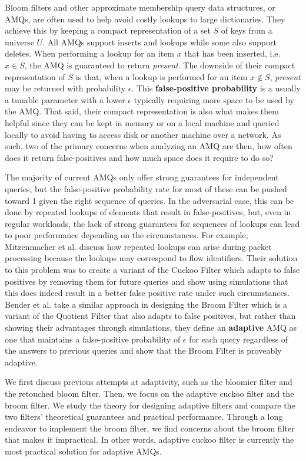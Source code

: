 \documentclass[../paper.tex]{subfiles}
\begin{document}
    Bloom filters and other approximate membership query data structures, or
    AMQs, are often used to help avoid costly lookups to large dictionaries.
    They achieve this by keeping a compact representation of a set
    $S$ of keys from a universe $U$.  All AMQs support inserts and lookups
    while some also support deletes.  When performing a lookup for an item $x$
    that has been inserted, i.e. $x\in S$, the AMQ is guaranteed to return
    {\it present}.  The downside of their compact representation of $S$ is
    that, when a lookup is performed for an item $x \notin S$, {\it present}
    may be returned with probability $\epsilon$.  This {\bf false-positive
    probability} is a usually a tunable parameter with a lower $\epsilon$
    typically requiring more space to be used by the AMQ.  That said, their
    compact representation is also what makes them helpful since they can be
    kept in memory or on a local machine and queried locally to avoid having to
    access disk or another machine over a network.  As such, two of the primary
    concerns when analyzing an AMQ are then, how often does it return
    false-positives and how much space does it require to do so?

    The majority of current AMQs only offer strong guarantees for independent
    queries, but the false-positive probability rate for most of these can be
    pushed toward 1 given the right sequence of queries.  In the adversarial
    case, this can be done by repeated lookups of elements that result in
    false-positives, but, even in regular workloads, the lack of strong
    guarantees for sequences of lookups can lead to poor performance depending
    on the circumstances.  For example, Mitzenmacher et al.
    \cite{adaptive-cuckoo} discuss how repeated lookups can arise during packet
    processing because the lookups may correspond to flow identifiers.  Their
    solution to this problem was to create a variant of the Cuckoo Filter
    \cite{cuckoo-filter} which adapts to false positives by removing them for
    future queries and show using simulations that this does indeed result in a
    better false positive rate under such circumstances.  Bender et al.
    \cite{broom-filter} take a similar approach in designing the Broom Filter
    which is a variant of the Quotient Filter \cite{quotient-filter} that also
    adapts to false positives, but rather than showing their advantages through
    simulations, they define an {\bf adaptive} AMQ as one that maintains a
    false-positive probability of $\epsilon$ for each query regardless of the
    answers to previous queries and show that the Broom Filter is proveably
    adaptive.

    We first discuss previous attempts at adaptivity, such as the bloomier filter
    and the retouched bloom filter. Then, we focus on the adaptive cuckoo filter
    and the broom filter. We study the theory for designing adaptive filters and
    compare the two filters' theoretical guarantees and practical performance.
    Through a long endeavor to implement the broom filter, we find concerns about
    the broom filter that makes it impractical. In other words, adaptive cuckoo
    filter is currently the most practical solution for adaptive AMQs.
\end{document}
